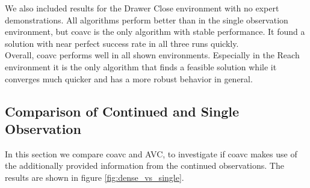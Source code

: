 We also included results for the Drawer Close environment with no expert demonstrations. All algorithms perform better than in the single observation environment, 
but \ac{coavc} is the only algorithm with stable performance. It found a solution with near perfect success rate in all three runs quickly. \\

Overall, \ac{coavc} performs well in all shown environments. Especially in the Reach environment it is the only algorithm that finds a feasible solution while it 
converges much quicker and has a more robust behavior in general. 






\subsection{Comparison of Continued and Single Observation}
\label{sec:com_coavc_avc}
In this section we compare \ac{coavc} and AVC, to investigate if \ac{coavc} makes use of the additionally provided information from the continued observations. 
The results are shown in figure \ref{fig:dense_vs_single}.\\

